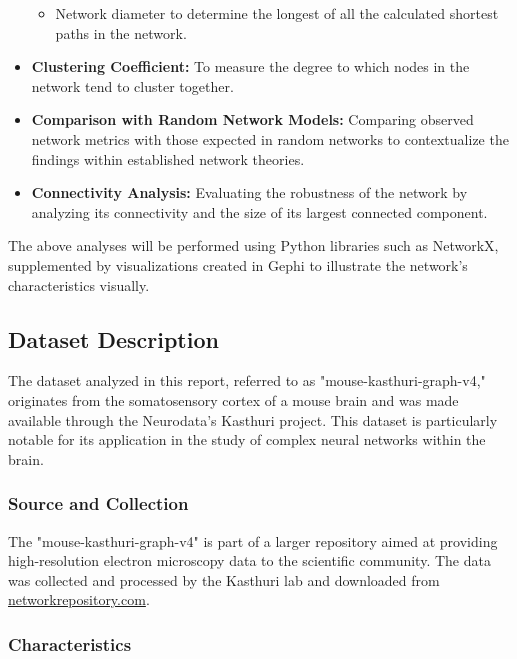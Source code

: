 \documentclass[
	report, %
	11pt, %
]{CSUniSchoolLabReport}
\begin{document}
\begin{itemize}
\begin{itemize}
			\item Network diameter to determine the longest of all the calculated shortest paths in the network.
		\end{itemize}
		\item \textbf{Clustering Coefficient:} To measure the degree to which nodes in the network tend to cluster together.
		\item \textbf{Comparison with Random Network Models:} Comparing observed network metrics with those expected in random networks to contextualize the findings within established network theories.
		\item \textbf{Connectivity Analysis:} Evaluating the robustness of the network by analyzing its connectivity and the size of its largest connected component.
		\end{itemize}
		\vspace{10pt}

		The above analyses will be performed using Python libraries such as NetworkX, supplemented by visualizations created in Gephi to illustrate the network's characteristics visually.

		\subsection{Dataset Description}

		The dataset analyzed in this report, referred to as "mouse-kasthuri-graph-v4," originates from the somatosensory cortex of a mouse brain and was made available through the Neurodata's Kasthuri project. This dataset is particularly notable for its application in the study of complex neural networks within the brain.
		
		\subsubsection{Source and Collection}
		
		The "mouse-kasthuri-graph-v4" is part of a larger repository aimed at providing high-resolution electron microscopy data to the scientific community. The data was collected and processed by the Kasthuri lab and downloaded from \href{http://networkrepository.com/mouse-kasthuri-graph-v4.php}{networkrepository.com}.
		
		\subsubsection{Characteristics}
		
\end{document}
